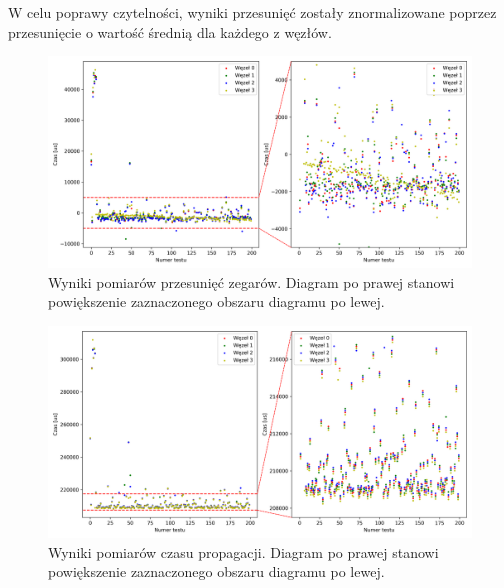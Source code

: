 W celu poprawy czytelności, wyniki przesunięć zostały znormalizowane poprzez przesunięcie o wartość średnią dla każdego z węzłów.

\begin{figure}[H]
    \centering
    \includegraphics[width=\textwidth]{pics/ntp_sync/offsets.png}
    \caption[Wyniki pomiarów przesunięć zegarów]{Wyniki pomiarów przesunięć zegarów. Diagram po prawej stanowi powiększenie zaznaczonego obszaru diagramu po lewej.}
    \label{pic:offsets_ntp}
\end{figure}

\begin{figure}[H]
    \centering
    \includegraphics[width=\textwidth]{pics/ntp_sync/prop_times.png}
    \caption[Wyniki pomiarów czasu propagacji]{Wyniki pomiarów czasu propagacji. Diagram po prawej stanowi powiększenie zaznaczonego obszaru diagramu po lewej.}
    \label{pic:prop_times}
\end{figure}

